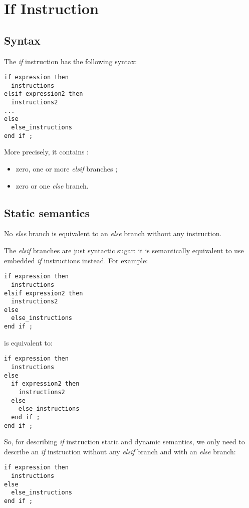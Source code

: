 \section{If Instruction}


\subsection{Syntax}

The \emph{if} instruction has the following syntax:
{
\begin{lstlisting}[language=galgas]
if expression then
  instructions
elsif expression2 then
  instructions2
...
else
  else_instructions
end if ;  
\end{lstlisting}
}

More precisely, it contains :
\begin{itemize}
\item zero, one or more \emph{elsif} branches ;
\item zero or one \emph{else} branch.
\end{itemize}


\subsection{Static semantics}


No \emph{else} branch is equivalent to an \emph{else} branch without any instruction.


The \emph{elsif} branches are just syntactic sugar: it is semantically equivalent to use embedded \emph{if} instructions instead. For example:
{
\begin{lstlisting}[language=galgas]
if expression then
  instructions
elsif expression2 then
  instructions2
else
  else_instructions
end if ;  
\end{lstlisting}
}
is equivalent to:
{
\begin{lstlisting}[language=galgas]
if expression then
  instructions
else
  if expression2 then
    instructions2
  else
    else_instructions
  end if ;  
end if ;  
\end{lstlisting}
}

So, for describing \emph{if} instruction static and dynamic semantics, we only need to describe an \emph{if} instruction without any \emph{elsif} branch and with an \emph{else} branch:
{
\begin{lstlisting}[language=galgas]
if expression then
  instructions
else
  else_instructions
end if ;
\end{lstlisting}
}

